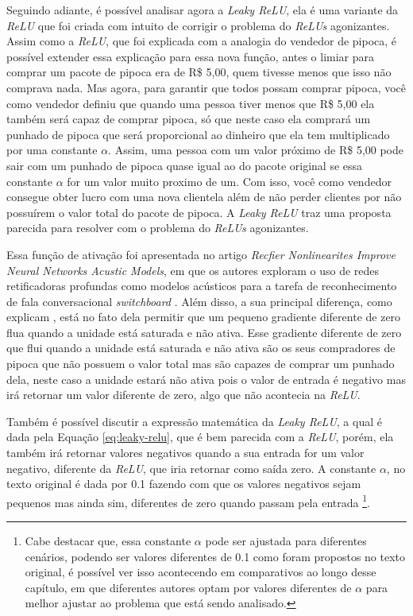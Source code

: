 Seguindo adiante, é possível analisar agora a \textit{Leaky ReLU}, ela é uma variante da \textit{ReLU} que foi criada com intuito de corrigir o problema do \textit{ReLUs} agonizantes. Assim como a \textit{ReLU}, que foi explicada com a analogia do vendedor de pipoca, é possível extender essa explicação para essa nova função, antes o limiar para comprar um pacote de pipoca era de R\$ 5,00, quem tivesse menos que isso não comprava nada. Mas agora, para garantir que todos possam comprar pipoca, você como vendedor definiu que quando uma pessoa tiver menos que R\$ 5,00 ela também será capaz de comprar pipoca, só que neste caso ela comprará um punhado de pipoca que será proporcional ao dinheiro que ela tem multiplicado por uma constante $\alpha$. Assim, uma pessoa com um valor próximo de R\$ 5,00 pode sair com um punhado de pipoca quase igual ao do pacote original se essa constante $\alpha$ for um valor muito proximo de um. Com isso, você como vendedor consegue obter lucro com uma nova clientela além de não perder clientes por não possuírem o valor total do pacote de pipoca. A \textit{Leaky ReLU} traz uma proposta parecida para resolver com o problema do \textit{ReLUs} agonizantes.

Essa função de ativação foi apresentada no artigo \textit{Recfier Nonlinearites Improve Neural Networks Acustic Models}, em que os autores exploram o uso de redes retificadoras profundas como modelos acústicos para a tarefa de reconhecimento de fala conversacional \textit{switchboard} \parencite{LeakyReLUArticle}. Além disso, a sua principal diferença, como explicam \textcite{LeakyReLUArticle}, está no fato dela permitir que um pequeno gradiente diferente de zero flua quando a unidade está saturada e não ativa. Esse gradiente diferente de zero que flui quando a unidade está saturada e não ativa são os seus compradores de pipoca que não possuem o valor total mas são capazes de comprar um punhado dela, neste caso a unidade estará não ativa pois o valor de entrada é negativo mas irá retornar um valor diferente de zero, algo que não acontecia na \textit{ReLU}.

Também é possível discutir a expressão matemática da \textit{Leaky ReLU}, a qual é dada pela Equação \ref{eq:leaky-relu}, que é bem parecida com a \textit{ReLU}, porém, ela também irá retornar valores negativos quando a sua entrada for um valor negativo, diferente da \textit{ReLU}, que iria retornar como saída zero. A constante $\alpha$, no texto original é dada por 0.1 fazendo com que os valores negativos sejam pequenos mas ainda sim, diferentes de zero quando passam pela entrada \parencite{LeakyReLUArticle} \footnote{Cabe destacar que, essa constante $\alpha$ pode ser ajustada para diferentes cenários, podendo ser valores diferentes de 0.1 como foram propostos no texto original, é possível ver isso acontecendo em comparativos ao longo desse capítulo, em que diferentes autores optam por valores diferentes de $\alpha$ para melhor ajustar ao problema que está sendo analisado.}. 


